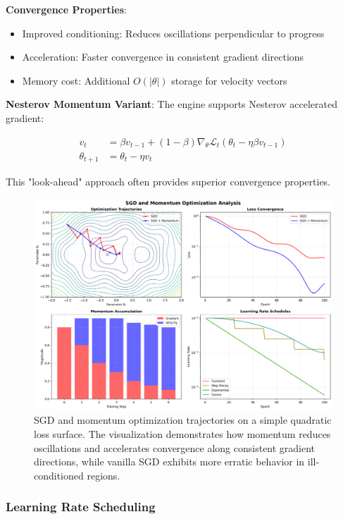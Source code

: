 \documentclass[11pt,a4paper]{report}
\begin{document}
\textbf{Convergence Properties}:
\begin{itemize}
\item Improved conditioning: Reduces oscillations perpendicular to progress
\item Acceleration: Faster convergence in consistent gradient directions
\item Memory cost: Additional $O(|\theta|)$ storage for velocity vectors
\end{itemize}

\textbf{Nesterov Momentum Variant}: The engine supports Nesterov accelerated gradient:

\begin{align}
v_t &= \beta v_{t-1} + (1 - \beta) \nabla_\theta \mathcal{L}_t(\theta_t - \eta \beta v_{t-1}) \\
\theta_{t+1} &= \theta_t - \eta v_t
\end{align}

This "look-ahead" approach often provides superior convergence properties.

\begin{figure}[H]
\centering
\includegraphics[width=\textwidth]{optimizer_sgd_momentum_analysis.png}
\caption{SGD and momentum optimization trajectories on a simple quadratic loss surface. The visualization demonstrates how momentum reduces oscillations and accelerates convergence along consistent gradient directions, while vanilla SGD exhibits more erratic behavior in ill-conditioned regions.}
\label{fig:sgd_momentum}
\end{figure}

\subsubsection{Learning Rate Scheduling}
\end{document}
